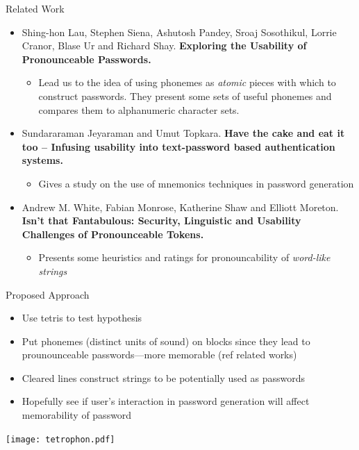 \documentclass[aspectratio=1610]{beamer}
\begin{document}
\begin{frame}{Related Work}
	\begin{itemize}
		\item Shing-hon Lau, Stephen Siena, Ashutosh Pandey, Sroaj Sosothikul, Lorrie Cranor, Blase Ur and Richard Shay. \textbf{Exploring the Usability of Pronounceable Passwords.}

		\begin{itemize}
			\item 
		Lead us to the idea of using phonemes as \emph{atomic} pieces with which to construct passwords. They present some sets of useful phonemes and compares them to alphanumeric character sets. 
		\end{itemize}
		\item Sundararaman Jeyaraman and Umut Topkara. \textbf{Have the cake and eat it too -- Infusing usability into text-password based authentication systems.}

		\begin{itemize}
			\item 
		Gives a study on the use of mnemonics techniques in password generation
		\end{itemize}
		\item Andrew M. White, Fabian Monrose, Katherine Shaw and Elliott Moreton. \textbf{Isn’t that Fantabulous: Security, Linguistic and Usability Challenges of Pronounceable Tokens.}

		\begin{itemize}
			\item 
		Presents some heuristics and ratings for pronouncability of \emph{word-like strings}
		\end{itemize}
	\end{itemize}
\end{frame}
\begin{frame}{Proposed Approach}
	\begin{itemize}
		\item Use tetris to test hypothesis
		\item Put phonemes (distinct units of sound) on blocks since they lead to prounounceable passwords---more memorable (ref related works)
		\item Cleared lines construct strings to be potentially used as passwords
		\item Hopefully see if user's interaction in password generation will affect memorability of password
	\end{itemize}
	\centering
	\texttt{[image: tetrophon.pdf]}
\end{frame}
\end{document}
